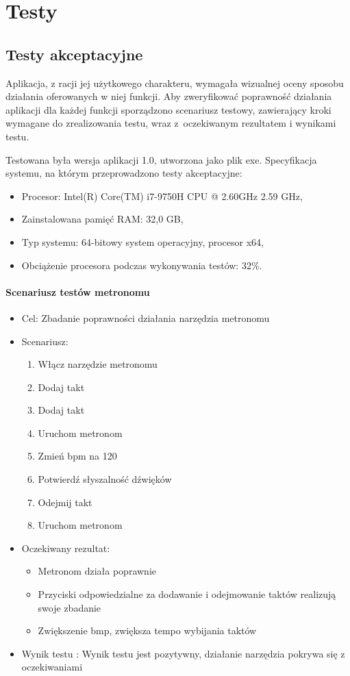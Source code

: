 \chapter{Testy}
\section{Testy akceptacyjne}
Aplikacja, z racji jej użytkowego charakteru, wymagała wizualnej oceny sposobu działania oferowanych w niej funkcji.
Aby zweryfikować poprawność działania aplikacji dla każdej funkcji sporządzono scenariusz testowy, zawierający kroki wymagane do zrealizowania testu, wraz z~oczekiwanym rezultatem i wynikami testu.

Testowana była wersja aplikacji 1.0, utworzona jako plik exe. 
Specyfikacja systemu, na którym przeprowadzono testy akceptacyjne:
\begin{itemize}
    \item Procesor: Intel(R) Core(TM) i7-9750H CPU @ 2.60GHz 2.59 GHz, 
    \item Zainstalowana pamięć RAM: 32,0 GB,
    \item Typ systemu: 64-bitowy system operacyjny, procesor x64,
    \item Obciążenie procesora podczas wykonywania testów: 32\%.
\end{itemize}

\subsubsection{Scenariusz testów metronomu}

\begin{itemize}
    \item Cel: Zbadanie poprawności działania narzędzia metronomu
    \item Scenariusz:
        \begin{enumerate}
            \item Włącz narzędzie metronomu
            \item Dodaj takt 
            \item Dodaj takt
            \item Uruchom metronom
            \item Zmień bpm na 120
            \item Potwierdź słyszalność dźwięków
            \item Odejmij takt
            \item Uruchom metronom
        \end{enumerate}
    \item Oczekiwany rezultat:
        \begin{itemize}
            \item Metronom działa poprawnie
            \item Przyciski odpowiedzialne za dodawanie i odejmowanie taktów realizują swoje zbadanie
            \item Zwiększenie bmp, zwiększa tempo wybijania taktów
        \end{itemize}
    \item Wynik testu : Wynik testu jest pozytywny, działanie narzędzia pokrywa się z oczekiwaniami
\end{itemize}

